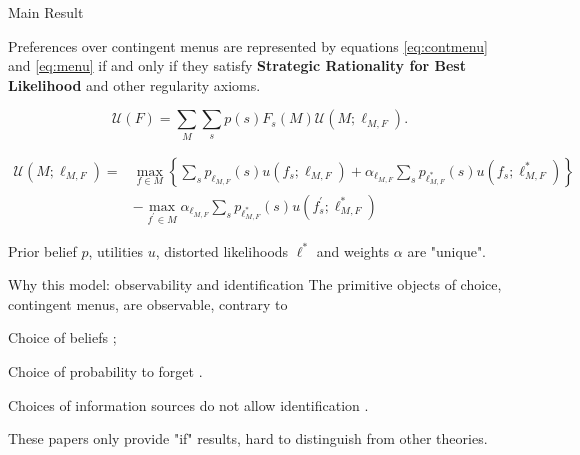 \documentclass[usenames,dvipsnames,aspectratio=169,11pt, envcountsect, handout]{beamer}
\begin{document}
\begin{frame}{Main Result}\label{mainresult}

	\begin{theorem}
		Preferences over contingent menus are represented by equations \ref{eq:contmenu} and \ref{eq:menu} if and only if they satisfy \textbf{Strategic Rationality for Best Likelihood} and other regularity axioms.
	\end{theorem}

	\vfill

	\begin{equation}\label{eq:contmenu}
		\mathscr{U}(F)= \sum_{M} \sum_{s} p \left( s \right) F_{s} \left( M \right) \mathcal{U} \left(M ; \ell_{M, F} \right) .
	\end{equation}

	\vfill

	\begin{equation}\label{eq:menu}
		\begin{aligned}
			\mathcal{U} \left(M ; \ell_{M, F} \right) = & \max _{f \in M}\left\{\sum_{s} p_{\ell_{M, F}} \left( s \right) u \left( f_{s} ; \ell_{M, F} \right) + \alpha_{\ell_{M, F}} \sum_{s} p_{\ell^{*}_{M, F}} \left( s \right) u \left( f_{s} ; \ell^{*}_{M, F} \right) \right\} \\
			                                            & -\max _{f^{\prime} \in M} \alpha _{\ell_{M, F}} \sum_{s} p_{\ell^{*}_{M, F}} \left( s \right) u\left(f^{\prime}_{s} ; \ell^{*}_{M, F} \right) \:
		\end{aligned}
	\end{equation}

	\vfill

	Prior belief \( p \), utilities \( u \), distorted likelihoods \( \ell^{*} \) and weights \( \alpha \) are "unique". \hyperlink{axiomsb1main}{}

\end{frame}

\begin{frame}{Why this model: observability and identification}
	The primitive objects of choice, contingent menus, are observable, contrary to

	\vfill

	\begin{wideitemize}
		\item Choice of beliefs \citep{brunnermeierOptimalExpectations2005,koszegiUtilityAnticipationPersonal2010};
		\item Choice of probability to forget \citep{benabou2016mindful}.
	\end{wideitemize}

	\vfill

	Choices of information sources do not allow identification \citep{eliazCanAnticipatoryFeelings2006}.

	\vfill

	These papers only provide "if" results, hard to distinguish from other theories.
\end{frame}
\end{document}
